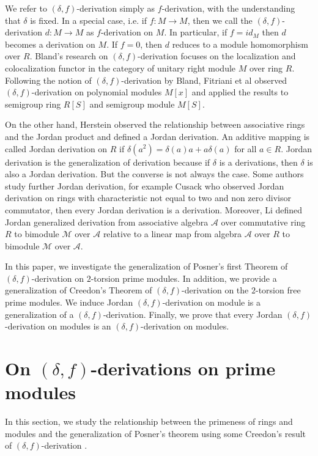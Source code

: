 \documentclass{arxiv}
\begin{document}
We refer to $(\delta,f)$-derivation simply as $f$-derivation, with the understanding that $\delta$ is fixed. In a special case, i.e.  if $f : M \rightarrow M$, then we call the $(\delta,f)$-derivation $d: M \rightarrow M$ as $f$-derivation on $M$. In particular, if $f=id_M$ then $d$ becomes a derivation on $M$. If $f=0$, then $d$ reduces to a module homomorphism over $R$. Bland's research on $(\delta,f)$-derivation focuses on the localization and colocalization functor in the category of unitary right module $M$ over ring $R$. Following the notion of $(\delta,f)$-derivation by Bland, Fitriani et al \cite{fitriani} observed $(\delta,f)$-derivation on polynomial modules $M[x]$ and applied the results to semigroup ring $R[S]$ and semigroup module $M[S]$. 

On the other hand, Herstein \cite{heirstein} observed the relationship between associative rings and the Jordan product and defined a Jordan derivation. An additive mapping is called Jordan derivation on $R$ if $\delta (a^2) = \delta (a)a+a \delta (a)$ for all $a \in R$. Jordan derivation is the generalization of derivation because if $\delta$ is a derivations, then $\delta$ is also a Jordan derivation. But the converse is not always the case. Some authors study further Jordan derivation, for example Cusack \cite{cusack} who observed Jordan derivation on rings with characteristic not equal to two and non zero divisor commutator, then every Jordan derivation is a derivation. Moreover, Li \cite{li} defined Jordan generalized derivation from associative algebra $\mathcal{A}$ over commutative ring $R$ to bimodule $\mathcal{M}$ over $\mathcal{A}$ relative to a linear map from algebra $\mathcal{A}$ over $R$ to bimodule $\mathcal{M}$ over $\mathcal{A}$.

In this paper, we investigate the generalization of Posner's first Theorem of $(\delta,f)$-derivation on $2$-torsion prime modules. In addition, we provide a generalization of Creedon's Theorem of $(\delta,f)$-derivation on the $2$-torsion free prime modules. We induce Jordan $(\delta,f)$-derivation on module is a generalization of a $(\delta,f)$-derivation. Finally, we prove that every Jordan $(\delta,f)$-derivation on modules is an $(\delta,f)$-derivation on modules.


\section{On $(\delta,f)$-derivations on prime modules}

In this section, we study the relationship between the primeness of rings and modules and the generalization of Posner's theorem using some Creedon's result of $(\delta,f)$-derivation \cite{creedon}. 
\end{document}
